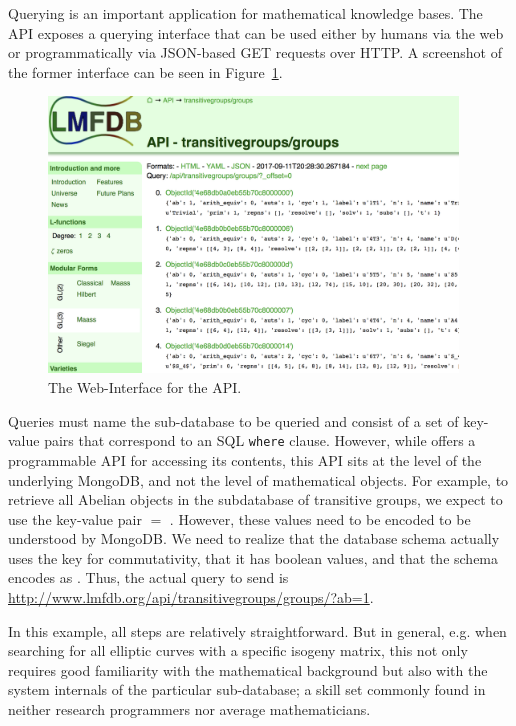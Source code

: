 Querying is an important application for mathematical knowledge bases.
The \lmfdb API \cite{lmfdbapi} exposes a querying interface that can be used either by humans via the web or programmatically via JSON-based GET requests over HTTP.
A screenshot of the former interface can be seen in Figure~\ref{fig:apiscreenshot}. 

\begin{figure}[ht]\centering
  \includegraphics[width=0.97\textwidth,viewport=0 240 800 600 ,clip=true]{../MACIS17-vt/APIScreenshot}
  \caption{The Web-Interface for the \lmfdb API.}\label {fig:apiscreenshot}
\end{figure}

Queries must name the sub-database to be queried and consist of a set of key-value pairs that correspond to an SQL \texttt{where} clause.
However, while \lmfdb offers a programmable API for accessing its contents, this API sits at the level of the underlying MongoDB, and not the level of mathematical objects. 
For example, to retrieve all Abelian objects in the subdatabase of transitive groups, we expect to use the key-value pair $ = $ . 
However, these values need to be encoded to be understood by MongoDB.
We need to realize that the database schema actually uses the key  for commutativity, that it has boolean values, and that the schema encodes  as . 
Thus, the actual query to send is \url{http://www.lmfdb.org/api/transitivegroups/groups/?ab=1}. 

In this example, all steps are relatively straightforward. 
But in general, e.g. when searching for all elliptic curves with a specific isogeny matrix, this not only requires good familiarity with the mathematical background but also with the system internals of the particular \lmfdb sub-database; a skill set commonly found in neither research programmers nor average mathematicians.   

